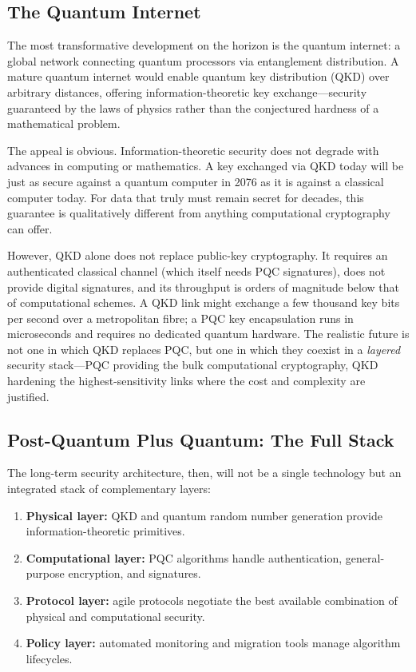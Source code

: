 \subsection{The Quantum Internet}
\label{subsec:quantum-internet}

The most transformative development on the horizon is the quantum internet: a global network connecting quantum processors via entanglement distribution.  A mature quantum internet would enable quantum key distribution (QKD) over arbitrary distances, offering information-theoretic key exchange---security guaranteed by the laws of physics rather than the conjectured hardness of a mathematical problem.

The appeal is obvious.  Information-theoretic security does not degrade with advances in computing or mathematics.  A key exchanged via QKD today will be just as secure against a quantum computer in 2076 as it is against a classical computer today.  For data that truly must remain secret for decades, this guarantee is qualitatively different from anything computational cryptography can offer.

However, QKD alone does not replace public-key cryptography.  It requires an authenticated classical channel (which itself needs PQC signatures), does not provide digital signatures, and its throughput is orders of magnitude below that of computational schemes.  A QKD link might exchange a few thousand key bits per second over a metropolitan fibre; a PQC key encapsulation runs in microseconds and requires no dedicated quantum hardware.  The realistic future is not one in which QKD replaces PQC, but one in which they coexist in a \emph{layered} security stack---PQC providing the bulk computational cryptography, QKD hardening the highest-sensitivity links where the cost and complexity are justified.

\subsection{Post-Quantum Plus Quantum: The Full Stack}
\label{subsec:full-stack}

The long-term security architecture, then, will not be a single technology but an integrated stack of complementary layers:
\begin{enumerate}
\item \textbf{Physical layer:} QKD and quantum random number generation provide information-theoretic primitives.
\item \textbf{Computational layer:} PQC algorithms handle authentication, general-purpose encryption, and signatures.
\item \textbf{Protocol layer:} agile protocols negotiate the best available combination of physical and computational security.
\item \textbf{Policy layer:} automated monitoring and migration tools manage algorithm lifecycles.
\end{enumerate}

